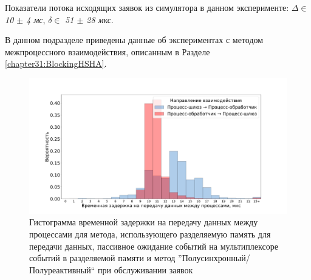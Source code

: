 Показатели потока исходящих заявок из симулятора в данном эксперименте: $\Delta \in$ \textit{10 $\pm$ 4 мс}, $\delta \in$ \textit{51 $\pm$ 28 мкс}.

В данном подразделе приведены данные об экспериментах с методом межпроцессного взаимодействия, описанным в Разделе \ref{chapter31:BlockingHSHA}.

\begin{figure}[!h]
\caption{Гистограмма временной задержки на передачу данных между процессами для метода, использующего разделяемую память для передачи данных, пассивное ожидание событий на мультиплексоре событий в разделяемой памяти и метод ''Полусинхронный/Полуреактивный`` при обслуживании заявок}
\label{chapter41:FigBlockingHSHA}
\includegraphics[width=\textwidth]{../../graphics/hist/BlockingHSHA}
\end{figure}

